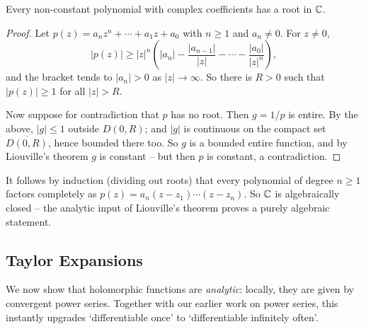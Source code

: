 \documentclass[a4paper]{scrartcl}
\begin{document}
\begin{theorem}
    Every non-constant polynomial with complex coefficients has a root in $\mathbb{C}$.
\end{theorem}
\begin{proof}
    Let $p(z) = a_n z^n + \cdots + a_1 z + a_0$ with $n \geq 1$ and $a_n \neq 0$. For $z \neq 0$,
    $$
    |p(z)| \geq |z|^n \left(|a_n| - \frac{|a_{n - 1}|}{|z|} - \cdots - \frac{|a_0|}{|z|^n}\right),
    $$
    and the bracket tends to $|a_n| > 0$ as $|z| \rightarrow \infty$. So there is $R > 0$ such that $|p(z)| \geq 1$ for all $|z| > R$.

    Now suppose for contradiction that $p$ has no root. Then $g = 1/p$ is entire. By the above, $|g| \leq 1$ outside $D(0, R)$; and $|g|$ is continuous on the compact set $\overline{D(0, R)}$, hence bounded there too. So $g$ is a bounded entire function, and by Liouville's theorem $g$ is constant -- but then $p$ is constant, a contradiction.
\end{proof}

\begin{remark}
    It follows by induction (dividing out roots) that every polynomial of degree $n \geq 1$ factors completely as $p(z) = a_n(z - z_1)\cdots(z - z_n)$. So $\mathbb{C}$ is algebraically closed -- the analytic input of Liouville's theorem proves a purely algebraic statement.
\end{remark}

\subsection{Taylor Expansions}

We now show that holomorphic functions are \emph{analytic}: locally, they are given by convergent power series. Together with our earlier work on power series, this instantly upgrades `differentiable once' to `differentiable infinitely often'.
\end{document}
